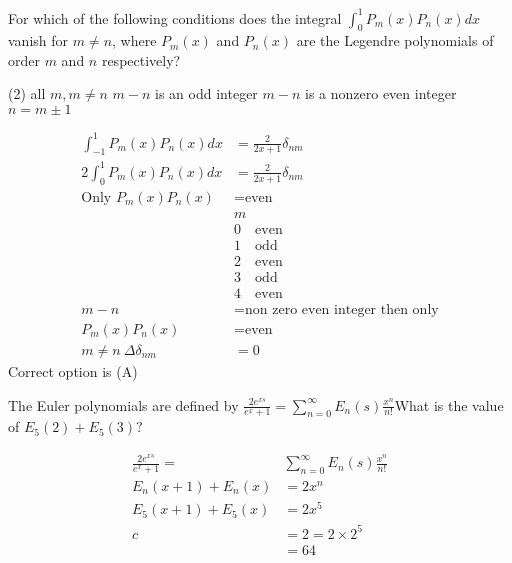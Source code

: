 \begin{questions}
\begin{minipage}{\textwidth}
	\question For which of the following conditions does the integral $\int_{0}^{1} P_{m}(x) P_{n}(x) d x$ vanish for $m \neq n$, where $P_{m}(x)$ and $P_{n}(x)$ are the Legendre polynomials of order $m$ and $n$ respectively?
\end{minipage}
\begin{tasks}(2)
	\task[\textbf{A.}] all $m, m \neq n$
	\task[\textbf{B.}]$m-n$ is an odd integer
	\task[\textbf{C.}]$m-n$ is a nonzero even integer
	\task[\textbf{D.}]$n=m \pm 1$
\end{tasks}
\begin{answer}
	\begin{align*}
	\int_{-1}^{1} P_{m}(x) P_{n}(x) d x&=\frac{2}{2 x+1} \delta_{n m}\\
	2 \int_{0}^{1} P_{m}(x) P_{n}(x) d x&=\frac{2}{2 x+1} \delta_{n m}\\
	\text{Only } P_{m}(x) P_{n}(x)&= \text{even}\\
	&m\\
	&0 \quad \text{even}\\
	&1 \quad \text{odd}\\
	&2 \quad \text{even}\\
	&3 \quad \text{odd}\\
	&4 \quad \text{even}\\
	m-n&= \text{non zero even integer then only}\\
	P_{m}(x) P_{n}(x)&= \text{even}\\
	m \neq n \ \Delta \delta_{n m}&=0
	\end{align*}
	Correct option is (A)
\end{answer}
\begin{minipage}{\textwidth}
	\question The Euler polynomials are defined by $\frac{2 e^{x s}}{e^{x}+1}=\sum_{n=0}^{\infty} E_{n}(s) \frac{x^{n}}{n !}$What is the value of $E_{5}(2)+E_{5}(3) ?$
\end{minipage}
\begin{answer}
	\begin{align*}
	\frac{2 e^{x s}}{e^{x}+1}=&\sum_{n=0}^{\infty} E_{n}(s) \frac{x^{n}}{n !}\\
	E_{n}(x+1)+E_{n}(x)&=2 x^{n}\\
	E_{5}(x+1)+E_{5}(x)&=2 x^{5}\\
	c&=2=2 \times 2^{5}\\&=64\\
	\end{align*}
\end{answer}


\end{questions}
